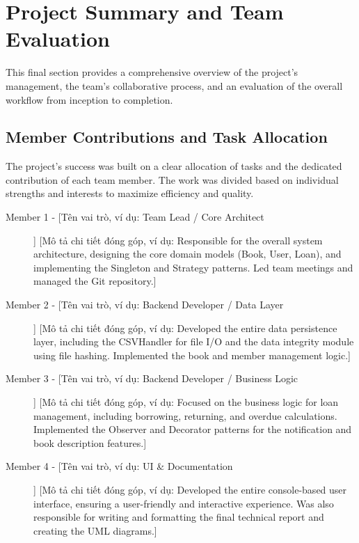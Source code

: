 \section{Project Summary and Team Evaluation}
\label{sec:team_evaluation}

This final section provides a comprehensive overview of the project's management, the team's collaborative process, and an evaluation of the overall workflow from inception to completion.

\subsection{Member Contributions and Task Allocation}
The project's success was built on a clear allocation of tasks and the dedicated contribution of each team member. The work was divided based on individual strengths and interests to maximize efficiency and quality.

\begin{description}
    \item[Member 1 - [Tên vai trò, ví dụ: Team Lead / Core Architect]]
    [Mô tả chi tiết đóng góp, ví dụ: Responsible for the overall system architecture, designing the core domain models (Book, User, Loan), and implementing the Singleton and Strategy patterns. Led team meetings and managed the Git repository.]

    \item[Member 2 - [Tên vai trò, ví dụ: Backend Developer / Data Layer]]
    [Mô tả chi tiết đóng góp, ví dụ: Developed the entire data persistence layer, including the CSVHandler for file I/O and the data integrity module using file hashing. Implemented the book and member management logic.]

    \item[Member 3 - [Tên vai trò, ví dụ: Backend Developer / Business Logic]]
    [Mô tả chi tiết đóng góp, ví dụ: Focused on the business logic for loan management, including borrowing, returning, and overdue calculations. Implemented the Observer and Decorator patterns for the notification and book description features.]

    \item[Member 4 - [Tên vai trò, ví dụ: UI & Documentation]]
    [Mô tả chi tiết đóng góp, ví dụ: Developed the entire console-based user interface, ensuring a user-friendly and interactive experience. Was also responsible for writing and formatting the final technical report and creating the UML diagrams.]

\end{description}


